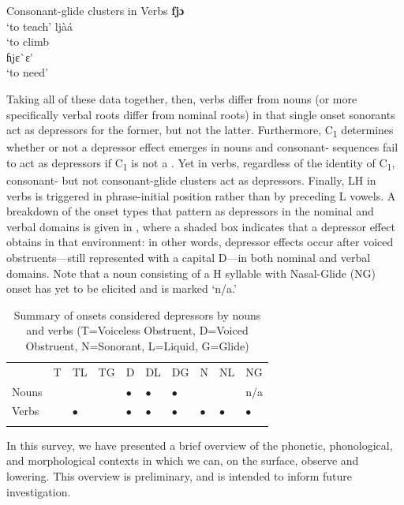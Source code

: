 \documentclass[output=paper
,newtxmath
,modfonts
,nonflat]{langsci/langscibook}
\begin{document}
\ea\label{ex:lotven:10}Consonant-glide clusters in  Verbs
\ea\label{ex:lotven:10a}
    \textbf{fjɔ}\\
    \glt ‘to teach’
\ex\label{ex:lotven:10b}
	ljàá\\
    \glt ‘to climb\\
\ex\label{ex:lotven:10c}
	ɦjɛ\`{}ɛ\'{}\\
    \glt ‘to need’
\z
\z
        

Taking all of these data together, then, verbs differ from nouns (or more specifically verbal roots differ from nominal roots) in that single onset sonorants act as depressors for the former, but not the latter. Furthermore, C\textsubscript{1} determines whether or not a depressor effect emerges in nouns and consonant- sequences fail to act as depressors if C\textsubscript{1} is not a . Yet in verbs, regardless of the identity of C\textsubscript{1}, consonant- but not consonant-glide clusters act as depressors. Finally, LH  in verbs is triggered in phrase-initial position rather than by preceding L  vowels. A breakdown of the onset types that pattern as depressors in the nominal and verbal domains is given in 
, where a shaded box indicates that a depressor effect obtains in that environment: in other words, depressor effects occur after voiced obstruents—still represented with a capital D—in both nominal and verbal domains. Note that a noun consisting of a H  syllable with Nasal-Glide (NG) onset has yet to be elicited and is marked ‘n/a.’

\begin{table}
\begin{tabularx}{\textwidth}{Xlllllllll}
\lsptoprule
& {T} & {TL} & {TG} & {D} & {DL} & {DG} & {N} & {NL} & {NG}\\
{Nouns} &  &  &  & $\bullet$ & $\bullet$ & $\bullet$ &  &  & n/a\\
{Verbs} &  & $\bullet$ &  & $\bullet$ & $\bullet$ & $\bullet$ & $\bullet$ & $\bullet$ & $\bullet$ \\
\lspbottomrule
\end{tabularx}
\caption{Summary of onsets considered depressors by nouns and verbs (T=Voiceless Obstruent, D=Voiced Obstruent, N=Sonorant, L=Liquid, G=Glide)}
\label{fig:lotven:6}
\end{table}

In this survey, we have presented a brief overview of the phonetic, phonological, and morphological contexts in which we can, on the surface, observe   and  lowering. This overview is preliminary, and is intended to inform future investigation.
\end{document}

